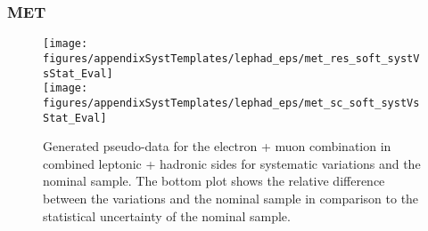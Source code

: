 
\clearpage
\subsubsection{MET}

\begin{figure}[!hb]
\begin{center}
        
        \texttt{[image: figures/appendixSystTemplates/lephad\_eps/met\_res\_soft\_systVsStat\_Eval]}\\
        \texttt{[image: figures/appendixSystTemplates/lephad\_eps/met\_sc\_soft\_systVsStat\_Eval]}\\
  
\caption{Generated pseudo-data for the electron + muon combination in combined leptonic + hadronic sides for systematic variations and the nominal \ttbar sample. The bottom plot shows the relative difference between the variations and the nominal sample in comparison to the statistical uncertainty of the nominal sample.}   
\label{fig:systematicVar_lephad_MET}
\end{center}                          
\end{figure}

\clearpage

